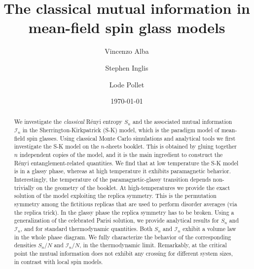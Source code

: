 \documentclass[twocolumn,superscriptaddress,prb,10pt]{revtex4-1}
\begin{document}
\title{The classical mutual information in mean-field spin glass models} 

\author{Vincenzo Alba}
\author{Stephen Inglis}
\author{Lode Pollet}

\date{\today}




\begin{abstract} 

We investigate the \emph{classical} R\'enyi entropy $S_n$ and the associated mutual 
information ${\mathcal I}_n$ in the Sherrington-Kirkpatrick (S-K) model, which is the 
paradigm model of mean-field spin glasses. 
Using classical Monte Carlo simulations and analytical tools we first investigate the 
S-K model on the $n$-sheets booklet.
This is obtained by gluing together $n$ independent copies of the model, and it is the 
main ingredient to construct the R\'enyi entanglement-related quantities. We find that at 
low temperature the S-K model is in a glassy phase, whereas at high temperature it exhibits 
paramagnetic behavior. Interestingly, the temperature of the paramagnetic-glassy 
transition depends non-trivially on the geometry of the booklet. At high-temperatures 
we provide the exact solution of the model exploiting the replica symmetry. This is the 
permutation symmetry among the fictitious replicas that are used to 
perform disorder averages (via the replica trick). In the glassy phase the replica symmetry 
has to be broken. Using a generalization of the celebrated Parisi solution, we provide 
analytical results for $S_n$ and ${\mathcal I}_n$, and for standard thermodynamic quantities. 
Both $S_n$ and ${\mathcal I}_n$ exhibit a volume law in the whole phase diagram. We fully 
characterize the behavior of the corresponding densities $S_n/N$ and ${\mathcal I}_n/N$, 
in the thermodynamic limit. Remarkably, at the critical point the mutual information does 
not exhibit any crossing for different system sizes, in contrast with local spin models. 

\end{abstract}

\end{document}
